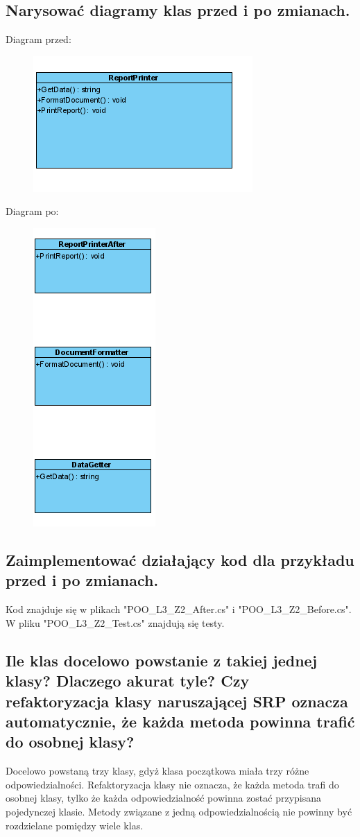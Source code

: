 \documentclass[10pt, a4paper]{article}
\begin{document}
\subsection*{Narysować diagramy klas przed i po zmianach.}
Diagram przed:
\begin{figure}[H]
\includegraphics{Before_diagram}
\end{figure}
Diagram po:
\begin{figure}[H]
\includegraphics{After_diagram}
\end{figure}
\subsection*{Zaimplementować działający kod dla przykładu przed i po zmianach.}
Kod znajduje się w plikach "POO\_L3\_Z2\_After.cs" i "POO\_L3\_Z2\_Before.cs". W pliku "POO\_L3\_Z2\_Test.cs" znajdują się testy.
\subsection*{Ile klas docelowo powstanie z takiej jednej klasy? Dlaczego akurat tyle? Czy refaktoryzacja klasy naruszającej SRP oznacza automatycznie, że każda metoda powinna trafić do osobnej klasy?}
Docelowo powstaną trzy klasy, gdyż klasa początkowa miała trzy różne odpowiedzialności. Refaktoryzacja klasy nie oznacza, że każda metoda trafi do osobnej klasy, tylko że każda odpowiedzialność powinna zostać przypisana pojedynczej klasie. Metody związane z jedną odpowiedzialnością nie powinny być rozdzielane pomiędzy wiele klas.
\end{document}
